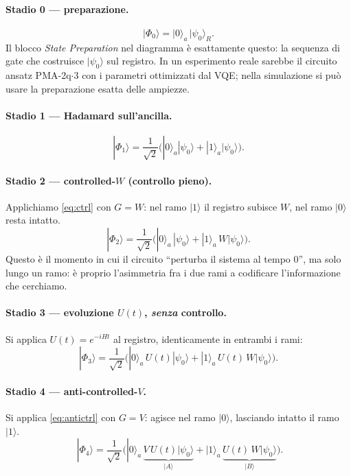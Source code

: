 \documentclass[11pt,a4paper]{article}
\begin{document}
\paragraph{Stadio 0 --- preparazione.}
\begin{equation}
|\Phi_0\rangle=|0\rangle_a\,|\psi_0\rangle_R .
\end{equation}
Il blocco \emph{State Preparation} nel diagramma è esattamente questo: la sequenza di gate che
costruisce $|\psi_0\rangle$ sul registro. In un esperimento reale sarebbe il circuito ansatz
PMA-2q$\cdot$3 con i parametri ottimizzati dal VQE; nella simulazione si può usare la
preparazione esatta delle ampiezze.

\paragraph{Stadio 1 --- Hadamard sull'ancilla.}
\begin{equation}
|\Phi_1\rangle=\frac{1}{\sqrt2}\Big(|0\rangle_a|\psi_0\rangle+|1\rangle_a|\psi_0\rangle\Big).
\end{equation}

\paragraph{Stadio 2 --- controlled-$W$ (controllo pieno).}
Applichiamo \eqref{eq:ctrl} con $G=W$: nel ramo $|1\rangle$ il registro subisce $W$, nel ramo
$|0\rangle$ resta intatto.
\begin{equation}
|\Phi_2\rangle=\frac{1}{\sqrt2}\Big(|0\rangle_a\,|\psi_0\rangle+|1\rangle_a\,W|\psi_0\rangle\Big).
\end{equation}
Questo è il momento in cui il circuito ``perturba il sistema al tempo $0$'', ma solo lungo un
ramo: è proprio l'asimmetria fra i due rami a codificare l'informazione che cerchiamo.

\paragraph{Stadio 3 --- evoluzione $U(t)$, \emph{senza} controllo.}
Si applica $U(t)=e^{-iHt}$ al registro, identicamente in entrambi i rami:
\begin{equation}
|\Phi_3\rangle=\frac{1}{\sqrt2}\Big(|0\rangle_a\,U(t)|\psi_0\rangle+|1\rangle_a\,U(t)\,W|\psi_0\rangle\Big).
\label{eq:phi3}
\end{equation}

\paragraph{Stadio 4 --- anti-controlled-$V$.}
Si applica \eqref{eq:antictrl} con $G=V$: agisce nel ramo $|0\rangle$, lasciando intatto il ramo
$|1\rangle$.
\begin{equation}
\boxed{\;|\Phi_4\rangle=\frac{1}{\sqrt2}\Big(|0\rangle_a\,\underbrace{V\,U(t)|\psi_0\rangle}_{\textstyle |A\rangle}
+|1\rangle_a\,\underbrace{U(t)\,W|\psi_0\rangle}_{\textstyle |B\rangle}\Big).}
\label{eq:phi4}
\end{equation}
\end{document}
